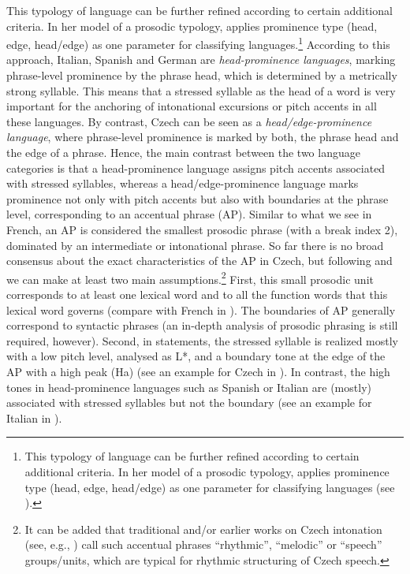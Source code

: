 This typology of language can be further refined according to certain additional criteria. In her model of a prosodic typology, \citet{Jun2005, Jun2014} applies prominence type (head, edge, head/edge) as one parameter for classifying languages.\footnote{This typology of language can be further refined according to certain additional criteria. In her model of a prosodic typology, \citet{Jun2005, Jun2014} applies prominence type (head, edge, head/edge) as one parameter for classifying languages (see ).} According to this approach, Italian, Spanish and German are \textit{head-prominence languages}, marking phrase-level prominence by the phrase head, which is determined by a metrically strong syllable. This means that a stressed syllable as the head of a word is very important for the anchoring of intonational excursions or pitch accents in all these languages. By contrast, Czech can be seen as a \textit{head/edge-prominence language}, where phrase-level prominence is marked by both, the phrase head and the edge of a phrase. Hence, the main contrast between the two language categories is that a head-prominence language assigns pitch accents associated with stressed syllables, whereas a head/edge-prominence language marks prominence not only with pitch accents but also with boundaries at the phrase level, corresponding to an accentual phrase (AP). Similar to what we see in French, an AP is considered the smallest prosodic phrase (with a break index 2), dominated by an intermediate or intonational phrase. So far there is no broad consensus about the exact characteristics of the AP in Czech, but following \citet{PeškováEtAl2018} and \citet{PeškováForthcoming} we can make at least two main assumptions.\footnote{It can be added that traditional and/or earlier works on Czech intonation (see, e.g., \citealt{Mathesius1937, Ondráčková1954, Palková2017}) call such accentual phrases ``rhythmic'', ``melodic'' or ``speech'' groups/units, which are typical for rhythmic structuring of Czech speech.} First, this small prosodic unit corresponds to at least one lexical word and to all the function words that this lexical word governs (compare with French in \citealt{Delais-RoussarieEtAl2015}). The boundaries of AP generally correspond to syntactic phrases (an in-depth analysis of prosodic phrasing is still required, however). Second, in statements, the stressed syllable is realized mostly with a low pitch level, analysed as L*, and a boundary tone at the edge of the AP with a high peak (Ha) (see an example for Czech in ). In contrast, the high tones in head-prominence languages such as Spanish or Italian are (mostly) associated with stressed syllables but not the boundary (see an example for Italian in ).




